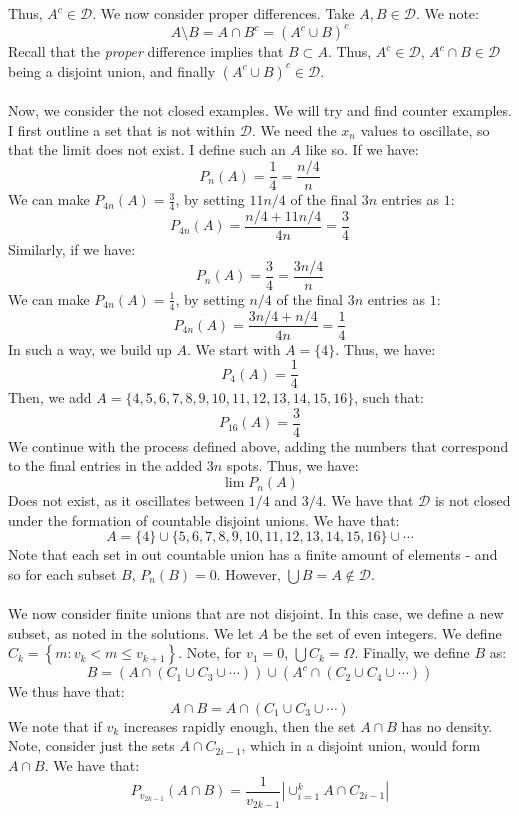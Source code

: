 \documentclass[12pt,a4paper]{article}
\newcommand{\1}[1]{\mathbbm{1}\left\{ #1 \right\}}
\newcommand{\dcal}{\mathcal{D}}
\begin{document}
Thus, $A^c \in \dcal$. We now consider proper differences. Take $A,B \in \dcal$. We note:
$$
	A \setminus B = A \cap B^c = (A^c \cup B)^c
$$
Recall that the \textit{proper} difference implies that $B \subset A$. Thus, $A^c \in \dcal$, $A^c \cap B \in \dcal$ being a disjoint union, and finally $(A^c \cup B)^c \in \dcal$.
\\\\
Now, we consider the not closed examples. We will try and find counter examples. I first outline a set that is not within $\dcal$. We need the $x_n$ values to oscillate, so that the limit does not exist. I define such an $A$ like so. If we have:
$$
	P_n(A) = \frac{1}{4} = \frac{n/4}{n}
$$
We can make $P_{4n}(A) = \frac{3}{4}$, by setting $11n/4$ of the final $3n$ entries as $1$:
$$
	P_{4n}(A) = \frac{n/4 + 11n/4}{4n} = \frac{3}{4}
$$
Similarly, if we have:
$$
	P_n(A) = \frac{3}{4} = \frac{3n/4}{n}
$$
We can make $P_{4n}(A) = \frac{1}{4}$, by setting $n/4$ of the final $3n$ entries as $1$:
$$
	P_{4n}(A) = \frac{3n/4 + n/4}{4n} = \frac{1}{4}
$$
In such a way, we build up $A$. We start with $A = \{4\}$. Thus, we have:
$$
	P_4(A) = \frac{1}{4}
$$
Then, we add $A = \{4,5,6,7,8,9,10,11,12,13,14,15,16\}$, such that:
$$
	P_{16}(A) = \frac{3}{4}
$$
We continue with the process defined above, adding the numbers that correspond to the final entries in the added $3n$ spots. Thus, we have:
$$
	\lim P_n(A)
$$
Does not exist, as it oscillates between $1/4$ and $3/4$. We have that $\dcal$ is not closed under the formation of countable disjoint unions. We have that:
$$
	A = \{4\} \cup \{5,6,7,8,9,10,11,12,13,14,15,16\} \cup \cdots
$$
Note that each set in out countable union has a finite amount of elements - and so for each subset $B$, $P_n(B) = 0$. However, $\bigcup B = A \not\in \dcal$.
\\\\
We now consider finite unions that are not disjoint. In this case, we define a new subset, as noted in the solutions. We let $A$ be the set of even integers. We define $C_k = \left\{m : v_k < m \leq v_{k+1}\right\}$. Note, for $v_1 = 0$, $\bigcup C_k = \Omega$. Finally, we define $B$ as:
$$
	B = \left(A \cap (C_1 \cup C_3 \cup \cdots)\right) \cup \left(A^c \cap (C_2 \cup C_4 \cup \cdots)\right)
$$
We thus have that:
$$
	A \cap B = A \cap (C_1 \cup C_3 \cup \cdots)
$$
We note that if $v_k$ increases rapidly enough, then the set $A \cap B$ has no density. Note, consider just the sets $A \cap C_{2i - 1}$, which in a disjoint union, would form $A \cap B$. We have that:
$$
	P_{v_{2k-1}}(A \cap B) = \frac{1}{v_{2k-1}} \left|\cup_{i=1}^k A \cap C_{2i-1}\right|
$$
\end{document}
